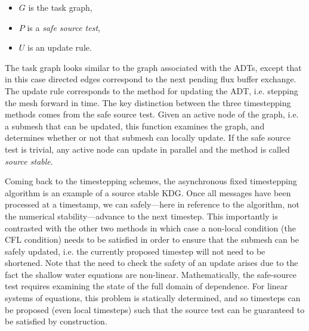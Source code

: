 \begin{itemize}
\item $G$ is the task graph,
\item $P$ is a {\em safe source test},
\item $U$ is an update rule.
\end{itemize}
The task graph looks similar to the graph associated with the ADTs, except that in this case directed edges correspond to the next pending flux buffer exchange. The update rule corresponds to the method for updating the ADT, i.e. stepping the mesh forward in time. The key distinction between the three timestepping methods comes from the safe source test. Given an active node of the graph, i.e. a submesh that can be updated, this function examines the graph, and determines whether or not that submesh can locally update. If the safe source test is trivial, any active node can update in parallel and the method is called {\em source stable}.

Coming back to the timestepping schemes, the asynchronous fixed timestepping algorithm is an example of a source stable KDG. Once all messages have been processed at a timestamp, we can safely---here in reference to the algorithm, not the numerical stability---advance to the next timestep. This importantly is contrasted with the other two methods in which case a non-local condition (the CFL condition) needs to be satisfied in order to ensure that the submesh can be safely updated, i.e. the currently proposed timestep will not need to be shortened. Note that the need to check the safety of an update arises due to the fact the shallow water equations are non-linear. Mathematically, the safe-source test requires examining the state of the full domain of dependence. For linear systems of equations, this problem is statically determined, and so timesteps can be proposed (even local timesteps) such that the source test can be guaranteed to be satisfied by construction.

